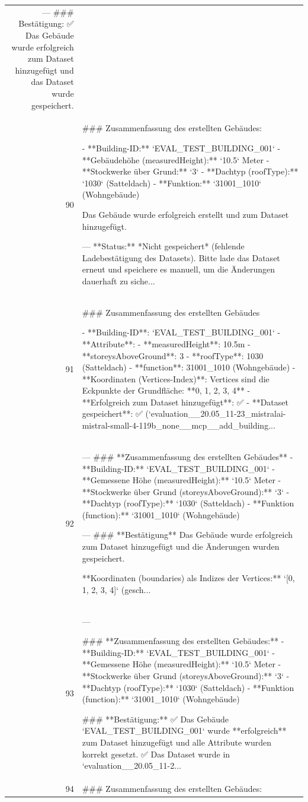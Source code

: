 \documentclass[a4paper,11pt]{article}
\begin{document}
\begin{table}[ht]
\begin{tabular}{r p{12cm}}
---
\#\#\# Bestätigung:
✅ Das Gebäude wurde erfolgreich zum Dataset hinzugefügt und das Dataset wurde gespeichert. \\
90 & \#\#\# Zusammenfassung des erstellten Gebäudes:

- **Building-ID:** `EVAL\_TEST\_BUILDING\_001`
- **Gebäudehöhe (measuredHeight):** `10.5` Meter
- **Stockwerke über Grund:** `3`
- **Dachtyp (roofType):** `1030` (Satteldach)
- **Funktion:** `31001\_1010` (Wohngebäude)

Das Gebäude wurde erfolgreich erstellt und zum Dataset hinzugefügt.

---
**Status:** *Nicht gespeichert* (fehlende Ladebestätigung des Datasets). Bitte lade das Dataset erneut und speichere es manuell, um die Änderungen dauerhaft zu siche... \\
91 & \#\#\# Zusammenfassung des erstellten Gebäudes

- **Building-ID**: `EVAL\_TEST\_BUILDING\_001`
- **Attribute**:
  - **measuredHeight**: 10.5m
  - **storeysAboveGround**: 3
  - **roofType**: 1030 (Satteldach)
  - **function**: 31001\_1010 (Wohngebäude)
- **Koordinaten (Vertices-Index)**:
  Vertices sind die Eckpunkte der Grundfläche: **0, 1, 2, 3, 4**
- **Erfolgreich zum Dataset hinzugefügt**: ✅
- **Dataset gespeichert**: ✅ (`evaluation\_\_20.05\_11-23\_mistralai-mistral-small-4-119b\_none\_\_mcp\_\_add\_building... \\
92 & ---
\#\#\# **Zusammenfassung des erstellten Gebäudes**
- **Building-ID:** `EVAL\_TEST\_BUILDING\_001`
- **Gemessene Höhe (measuredHeight):** `10.5` Meter
- **Stockwerke über Grund (storeysAboveGround):** `3`
- **Dachtyp (roofType):** `1030` (Satteldach)
- **Funktion (function):** `31001\_1010` (Wohngebäude)

---
\#\#\# **Bestätigung**
Das Gebäude wurde erfolgreich zum Dataset hinzugefügt und die Änderungen wurden gespeichert.

**Koordinaten (boundaries) als Indizes der Vertices:**
`[0, 1, 2, 3, 4]` (gesch... \\
93 & ---

\#\#\# **Zusammenfassung des erstellten Gebäudes:**
- **Building-ID:** `EVAL\_TEST\_BUILDING\_001`
- **Gemessene Höhe (measuredHeight):** `10.5` Meter
- **Stockwerke über Grund (storeysAboveGround):** `3`
- **Dachtyp (roofType):** `1030` (Satteldach)
- **Funktion (function):** `31001\_1010` (Wohngebäude)

\#\#\# **Bestätigung:**
✅ Das Gebäude `EVAL\_TEST\_BUILDING\_001` wurde **erfolgreich** zum Dataset hinzugefügt und alle Attribute wurden korrekt gesetzt.
✅ Das Dataset wurde in `evaluation\_\_20.05\_11-2... \\
94 & \#\#\# Zusammenfassung des erstellten Gebäudes:


\end{tabular}
\end{table}
\end{document}
